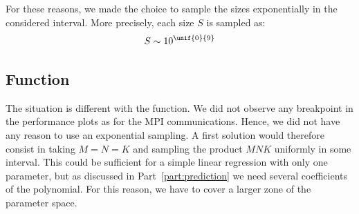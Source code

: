             For these reasons, we made the choice to sample the sizes exponentially in the considered interval. More
            precisely, each size $S$ is sampled as: \[S\sim10^{\unif{0}{9}}\]

        \subsection{Function \dgemm}%
        \label{sub:parameter_space:dgemm}

            The situation is different with the \dgemm function. We did not observe any breakpoint in the performance
            plots as for the MPI communications. Hence, we did not have any reason to use an exponential sampling. A
            first solution would therefore consist in taking \(M=N=K\) and sampling the product \(MNK\) uniformly in
            some interval.  This could be sufficient for a simple linear regression with only one parameter, but as
            discussed in Part~\ref{part:prediction} we need several coefficients of the polynomial. For this reason, we
            have to cover a larger zone of the parameter space.


